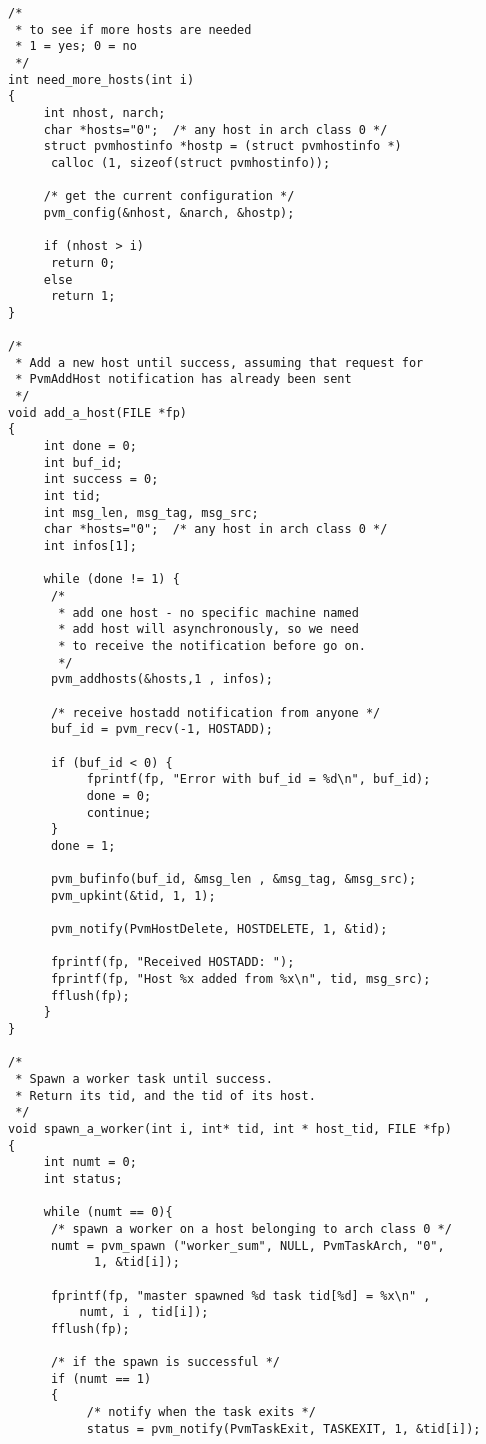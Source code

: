 \begin{small}
\begin{verbatim}
/* 
 * to see if more hosts are needed 
 * 1 = yes; 0 = no 
 */
int need_more_hosts(int i)
{
     int nhost, narch;
     char *hosts="0";  /* any host in arch class 0 */
     struct pvmhostinfo *hostp = (struct pvmhostinfo *) 
	  calloc (1, sizeof(struct pvmhostinfo));

     /* get the current configuration */
     pvm_config(&nhost, &narch, &hostp);
     
     if (nhost > i)
	  return 0;
     else 
	  return 1;
}

/* 
 * Add a new host until success, assuming that request for 
 * PvmAddHost notification has already been sent 
 */
void add_a_host(FILE *fp)
{
     int done = 0;
     int buf_id;
     int success = 0;
     int tid;
     int msg_len, msg_tag, msg_src;
     char *hosts="0";  /* any host in arch class 0 */
     int infos[1];

     while (done != 1) {
	  /* 
	   * add one host - no specific machine named 
	   * add host will asynchronously, so we need
	   * to receive the notification before go on.
	   */
	  pvm_addhosts(&hosts,1 , infos);
	  
	  /* receive hostadd notification from anyone */
	  buf_id = pvm_recv(-1, HOSTADD);
	  
	  if (buf_id < 0) {
	       fprintf(fp, "Error with buf_id = %d\n", buf_id);
	       done = 0;
	       continue;
	  }
	  done = 1;
     
	  pvm_bufinfo(buf_id, &msg_len , &msg_tag, &msg_src);
	  pvm_upkint(&tid, 1, 1);

	  pvm_notify(PvmHostDelete, HOSTDELETE, 1, &tid);

	  fprintf(fp, "Received HOSTADD: ");
	  fprintf(fp, "Host %x added from %x\n", tid, msg_src);
	  fflush(fp);
     }
}

/* 
 * Spawn a worker task until success.  
 * Return its tid, and the tid of its host. 
 */
void spawn_a_worker(int i, int* tid, int * host_tid, FILE *fp)
{
     int numt = 0;
     int status;

     while (numt == 0){
	  /* spawn a worker on a host belonging to arch class 0 */
	  numt = pvm_spawn ("worker_sum", NULL, PvmTaskArch, "0",
			1, &tid[i]);

	  fprintf(fp, "master spawned %d task tid[%d] = %x\n" , 
		  numt, i , tid[i]);
	  fflush(fp);
     
	  /* if the spawn is successful */
	  if (numt == 1)
	  {
	       /* notify when the task exits */
	       status = pvm_notify(PvmTaskExit, TASKEXIT, 1, &tid[i]);
	       

\end{verbatim}
\end{small}
